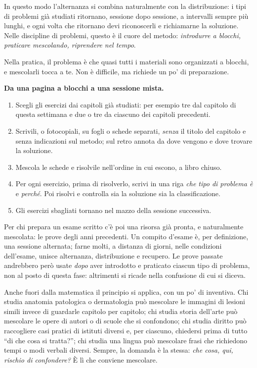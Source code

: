In questo modo l'alternanza si combina naturalmente con la
distribuzione: i tipi di problemi già studiati ritornano, sessione dopo
sessione, a intervalli sempre più lunghi, e ogni volta che ritornano
devi riconoscerli e richiamarne la soluzione. Nelle discipline di
problemi, questo è il cuore del metodo: \emph{introdurre a blocchi,
praticare mescolando, riprendere nel tempo}.

Nella pratica, il problema è che quasi tutti i materiali sono
organizzati a blocchi, e mescolarli tocca a te. Non è difficile, ma
richiede un po' di preparazione.

\begin{inpratica}
\textbf{Da una pagina a blocchi a una sessione mista.}
\begin{enumerate}
  \item Scegli gli esercizi dai capitoli già studiati: per esempio
        tre dal capitolo di questa settimana e due o tre da ciascuno
        dei capitoli precedenti.
  \item Scrivili, o fotocopiali, su fogli o schede separati,
        \emph{senza} il titolo del capitolo e senza indicazioni sul
        metodo; sul retro annota da dove vengono e dove trovare la
        soluzione.
  \item Mescola le schede e risolvile nell'ordine in cui escono, a
        libro chiuso.
  \item Per ogni esercizio, prima di risolverlo, scrivi in una riga
        \emph{che tipo di problema è} e \emph{perché}. Poi risolvi e
        controlla sia la soluzione sia la classificazione.
  \item Gli esercizi sbagliati tornano nel mazzo della sessione
        successiva.
\end{enumerate}
\end{inpratica}

Per chi prepara un esame scritto c'è poi una risorsa già pronta,
e naturalmente mescolata: le prove degli anni precedenti. Un compito
d'esame è, per definizione, una sessione alternata; farne molti, a
distanza di giorni, nelle condizioni dell'esame, unisce alternanza,
distribuzione e recupero. Le prove passate andrebbero però usate
\emph{dopo} aver introdotto e praticato ciascun tipo di problema, non
al posto di questa fase: altrimenti si ricade nella confusione di cui
si diceva.

Anche fuori dalla matematica il principio si applica, con un po' di
inventiva. Chi studia anatomia patologica o dermatologia può mescolare
le immagini di lesioni simili invece di guardarle capitolo per
capitolo; chi studia storia dell'arte può mescolare le opere di
autori o di scuole che si confondono; chi studia diritto può
raccogliere casi pratici di istituti diversi e, per ciascuno, chiedersi
prima di tutto \enquote{di che cosa si tratta?}; chi studia una lingua
può mescolare frasi che richiedono tempi o modi verbali diversi.
Sempre, la domanda è la stessa: \emph{che cosa, qui, rischio di
confondere?} È lì che conviene mescolare.

